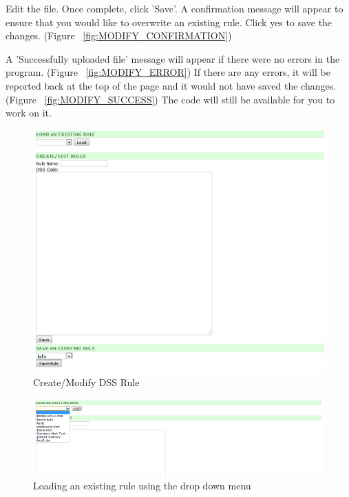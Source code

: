 \documentclass[12pt,letterpaper]{article}
\begin{document}
Edit the file. Once complete, click 'Save'. A confirmation message will appear to ensure that you would like to overwrite an existing rule. Click yes to save the changes.
(Figure ~\ref{fig:MODIFY_CONFIRMATION})

A 'Successfully uploaded file' message will appear if there were no errors in the program. 
(Figure ~\ref{fig:MODIFY_ERROR})
If there are any errors, it will be reported back at the top of the page and it would not have saved the changes. 
(Figure ~\ref{fig:MODIFY_SUCCESS})
The code will still be available for you to work on it.

\begin{figure}\begin{center}
\includegraphics[width=6.5in]{user_guide/create_modify.png}
\end{center}
\caption{Create/Modify DSS Rule}
\label{fig:CREATE_MODIFY}
\end{figure}

\begin{figure}\begin{center}
\includegraphics[width=6.5in]{user_guide/load_rule.png}
\end{center}
\caption{Loading an existing rule using the drop down menu}
\label{fig:LOAD_RULE}
\end{figure}
\end{document}

